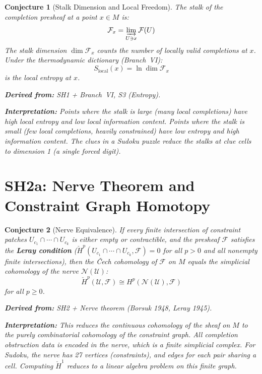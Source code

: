 \documentclass[11pt,letterpaper]{article}
\newtheorem{conjecture}{Conjecture}[section]
\newcommand{\Hcech}{\check{H}}
\newcommand{\sheaf}{\mathcal{F}}
\newcommand{\cover}{\mathcal{U}}
\newcommand{\nerve}{\mathcal{N}}
\begin{document}
\begin{conjecture}[Stalk Dimension and Local 
Freedom]\label{conj:stalks}
The \emph{stalk} of the completion presheaf at a point $x \in M$ is:
\begin{equation}\label{eq:stalk}
    \sheaf_x = \varinjlim_{U \ni x} \sheaf(U)
\end{equation}
The stalk dimension $\dim \sheaf_x$ counts the number of locally 
valid completions at $x$. Under the thermodynamic dictionary 
(Branch~VI):
\begin{equation}\label{eq:stalk_entropy}
    S_{\mathrm{local}}(x) = \ln \dim \sheaf_x
\end{equation}
is the \emph{local entropy} at $x$.

\textbf{Derived from:} SH1 + Branch~VI, S3 (Entropy).

\textbf{Interpretation:} Points where the stalk is large (many local 
completions) have high local entropy and low local information content. 
Points where the stalk is small (few local completions, heavily 
constrained) have low entropy and high information content. The clues 
in a Sudoku puzzle reduce the stalks at clue cells to dimension 1 
(a single forced digit).
\end{conjecture}

\section{SH2a: Nerve Theorem and Constraint Graph Homotopy}

\begin{conjecture}[Nerve Equivalence]\label{conj:nerve}
If every finite intersection of constraint patches $U_{c_1} \cap 
\cdots \cap U_{c_k}$ is either empty or contractible, \emph{and} 
the presheaf $\sheaf$ satisfies the \textbf{Leray condition} 
($\Hcech^p(U_{c_1} \cap \cdots \cap U_{c_k}, \sheaf) = 0$ for all 
$p > 0$ and all nonempty finite intersections), then the 
\v{C}ech cohomology of $\sheaf$ on $M$ equals the simplicial 
cohomology of the nerve $\nerve(\cover)$:
\begin{equation}\label{eq:nerve_theorem}
    \Hcech^p(\cover, \sheaf) \cong H^p(\nerve(\cover), \sheaf)
\end{equation}
for all $p \geq 0$.

\textbf{Derived from:} SH2 + Nerve theorem (Borsuk 1948, 
Leray 1945).

\textbf{Interpretation:} This reduces the continuous cohomology of 
the sheaf on $M$ to the purely \emph{combinatorial} cohomology of 
the constraint graph. All completion obstruction data is encoded in 
the nerve, which is a finite simplicial complex. For Sudoku, the 
nerve has 27 vertices (constraints), and edges for each pair sharing 
a cell. Computing $\Hcech^1$ reduces to a linear algebra problem on 
this finite graph.
\end{conjecture}
\end{document}
